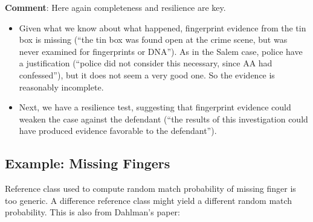\documentclass[
  10pt,
  dvipsnames,enabledeprecatedfontcommands]{scrartcl}
\providecommand{\tightlist}{%
  \setlength{\itemsep}{0pt}\setlength{\parskip}{0pt}}
\begin{document}

\textbf{Comment}: Here again completeness and resilience are key.

\begin{itemize}
\tightlist
\item
  Given what we know about what happened, fingerprint evidence from the
  tin box is missing (``the tin box was found open at the crime scene,
  but was never examined for fingerprints or DNA''). As in the Salem
  case, police have a justification (``police did not consider this
  necessary, since AA had confessed''), but it does not seem a very good
  one. So the evidence is reasonably incomplete.
\end{itemize}



\begin{itemize}
\tightlist
\item
  Next, we have a resilience test, suggesting that fingerprint evidence
  could weaken the case against the defendant (``the results of this
  investigation could have produced evidence favorable to the
  defendant'').
\end{itemize}

\hypertarget{example-missing-fingers}{%
\subsection{Example: Missing Fingers}\label{example-missing-fingers}}

Reference class used to compute random match probability of missing
finger is too generic. A difference reference class might yield a
different random match probability. This is also from Dahlman's paper:
\end{document}
